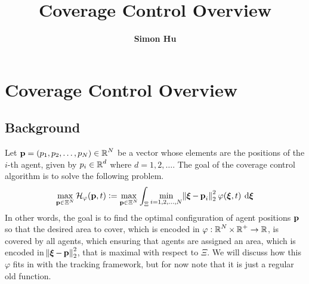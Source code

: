 \documentclass{article}
\title{\bf\Large Coverage Control Overview}
\author{\bf Simon Hu}
\date{}
\DeclareMathOperator{\bxi}{\boldsymbol{\xi}}
\begin{document}
\maketitle 
\glsaddall
\printglossary[style=mystyle, type=symbolslist]
\newpage

\section{Coverage Control Overview}
\subsection{Background}
Let $\operatorname{\mathbf{p}} = (p_1, p_2, \dots, p_N) \in \operatorname{\mathbb{R}}^N$ be a vector whose elements are the positions of the $i$-th agent, given by $p_i \in \operatorname{\mathbb{R}}^d$ where $d=1, 2, \dots$. The goal of the coverage control algorithm is to solve the following problem.
\begin{equation}
	\label{eq:problem statement}
	\displaystyle \max\limits_{\bp \in \Xi^N}{\mathcal{H}_{\varphi}(\bp, t)} := \max\limits_{\bp \in \Xi^N}{\int_{\Xi}{\min\limits_{i=1, 2, \dots, N}{\norm{\bxi - \bp_i}^2_2} \: \varphi(\bxi, t) \: \dif \bxi}}
\end{equation}
In other words, the goal is to find the optimal configuration of agent positions $\operatorname{\mathbf{p}}$ so that the desired area to cover, which is encoded in $\varphi : \operatorname{\mathbb{R}}^N \times \operatorname{\mathbb{R}}^+ \to \operatorname{\mathbb{R}}$, is covered by all agents, which ensuring that agents are assigned an area, which is encoded in $\norm{\bxi - \bp}_2^2$, that is maximal with respect to $\Xi$. We will discuss how this $\varphi$ fits in with the tracking framework, but for now note that it is just a regular old function.
\end{document}
